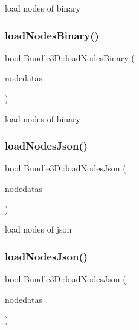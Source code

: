 load nodes of binary \mbox{\label{classBundle3D_a83744280068184dce4d36dc6260e69b8}} 
\subsubsection{\texorpdfstring{load\+Nodes\+Binary()}{loadNodesBinary()}\hspace{0.1cm}{\footnotesize\ttfamily [2/2]}}
{\footnotesize\ttfamily bool Bundle3\+D\+::load\+Nodes\+Binary (\begin{DoxyParamCaption}\item[{\hyperlink{structNodeDatas}{Node\+Datas} \&}]{nodedatas }\end{DoxyParamCaption})\hspace{0.3cm}{\ttfamily [protected]}}

load nodes of binary \mbox{\label{classBundle3D_a3e4b6166d71360d79c4e043f780f6960}} 
\subsubsection{\texorpdfstring{load\+Nodes\+Json()}{loadNodesJson()}\hspace{0.1cm}{\footnotesize\ttfamily [1/2]}}
{\footnotesize\ttfamily bool Bundle3\+D\+::load\+Nodes\+Json (\begin{DoxyParamCaption}\item[{\hyperlink{structNodeDatas}{Node\+Datas} \&}]{nodedatas }\end{DoxyParamCaption})\hspace{0.3cm}{\ttfamily [protected]}}

load nodes of json \mbox{\label{classBundle3D_a3e4b6166d71360d79c4e043f780f6960}} 
\subsubsection{\texorpdfstring{load\+Nodes\+Json()}{loadNodesJson()}\hspace{0.1cm}{\footnotesize\ttfamily [2/2]}}
{\footnotesize\ttfamily bool Bundle3\+D\+::load\+Nodes\+Json (\begin{DoxyParamCaption}\item[{\hyperlink{structNodeDatas}{Node\+Datas} \&}]{nodedatas }\end{DoxyParamCaption})\hspace{0.3cm}{\ttfamily [protected]}}

